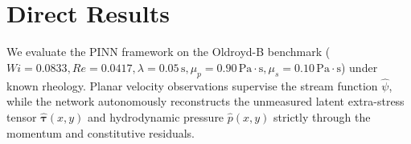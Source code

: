 \begin{table}[htbp]
    \centering
    \caption{Optimization hyperparameters, precision schedule, and transfer learning settings.}
    \label{tab:optimization_hyperparameters}
\end{table}

\section{Direct Results}
\label{sec:forward_solver_validation}

We evaluate the PINN framework on the Oldroyd-B benchmark
($Wi = 0.0833, Re = 0.0417, \lambda = 0.05\,\mathrm{s}, \mu_p = 0.90\,\mathrm{Pa\cdot s}, \mu_s = 0.10\,\mathrm{Pa\cdot s}$)
under known rheology. Planar velocity observations supervise the stream function
$\hat{\psi}$, while the network autonomously reconstructs the unmeasured latent
extra-stress tensor $\hat{\boldsymbol{\tau}}(x, y)$ and hydrodynamic pressure $\hat{p}(x, y)$
strictly through the momentum and constitutive residuals.

